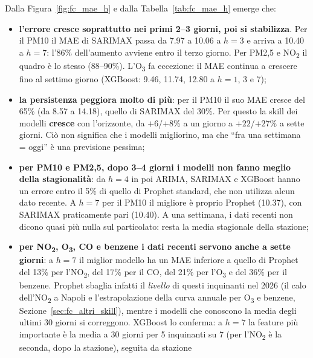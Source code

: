 \documentclass[11pt]{report}
\begin{document}
Dalla Figura~\ref{fig:fc_mae_h} e dalla Tabella~\ref{tab:fc_mae_h} emerge che:
\begin{itemize}
  \item \textbf{l'errore cresce soprattutto nei primi 2--3 giorni, poi si
        stabilizza}. Per il PM10 il MAE di SARIMAX passa da \num{7.97} a
        \num{10.06} a $h=3$ e arriva a \num{10.40} a $h=7$: l'86\% dell'aumento
        avviene entro il terzo giorno. Per PM2,5 e NO\textsubscript{2} il quadro è
        lo stesso (88--90\%). L'O\textsubscript{3} fa eccezione: il MAE continua a
        crescere fino al settimo giorno (XGBoost: \num{9.46}, \num{11.74},
        \num{12.80} a $h=1$, 3 e 7);
  \item \textbf{la persistenza peggiora molto di più}: per il PM10 il suo MAE
        cresce del 65\% (da \num{8.57} a \num{14.18}), quello di SARIMAX del 30\%.
        Per questo la skill dei modelli \textbf{cresce} con l'orizzonte, da
        $+6$/$+8$\% a un giorno a $+22$/$+27$\% a sette giorni. Ciò non significa
        che i modelli migliorino, ma che ``fra una settimana = oggi'' è una
        previsione pessima;
  \item \textbf{per PM10 e PM2,5, dopo 3--4 giorni i modelli non fanno meglio della
        stagionalità}: da $h=4$ in poi ARIMA, SARIMAX e XGBoost hanno un errore
        entro il 5\% di quello di Prophet standard, che non utilizza alcun dato
        recente. A $h=7$ per il PM10 il migliore è proprio Prophet (\num{10.37}),
        con SARIMAX praticamente pari (\num{10.40}). A una settimana, i dati
        recenti non dicono quasi più nulla sul particolato: resta la media
        stagionale della stazione;
  \item \textbf{per NO\textsubscript{2}, O\textsubscript{3}, CO e benzene i dati
        recenti servono anche a sette giorni}: a $h=7$ il miglior modello ha un MAE
        inferiore a quello di Prophet del 13\% per l'NO\textsubscript{2}, del 17\%
        per il CO, del 21\% per l'O\textsubscript{3} e del 36\% per il benzene.
        Prophet sbaglia infatti il \emph{livello} di questi inquinanti nel 2026
        (il calo dell'NO\textsubscript{2} a Napoli e l'estrapolazione della curva
        annuale per O\textsubscript{3} e benzene,
        Sezione~\ref{sec:fc_altri_skill}), mentre i modelli che conoscono la media
        degli ultimi 30 giorni si correggono. XGBoost lo conferma: a $h=7$ la
        feature più importante è la media a 30 giorni per 5 inquinanti su 7 (per
        l'NO\textsubscript{2} è la seconda, dopo la stazione), seguita da stazione

\end{itemize}
\end{document}
